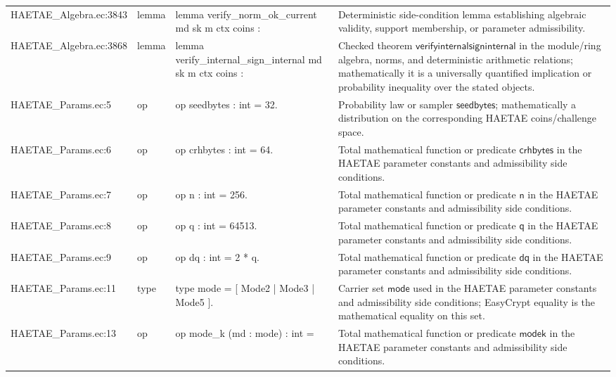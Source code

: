 \documentclass[10pt]{article}
\begin{document}
\begin{longtable}{L{0.11\textwidth}L{0.055\textwidth}L{0.385\textwidth}L{0.41\textwidth}}
HAETAE\_\allowbreak{}Algebra.\allowbreak{}ec:\allowbreak{}3843 & lemma & {\ttfamily\scriptsize lemma verify\_\allowbreak{}norm\_\allowbreak{}ok\_\allowbreak{}current md sk m ctx coins :} & Deterministic side-condition lemma establishing algebraic validity, support membership, or parameter admissibility. \\
HAETAE\_\allowbreak{}Algebra.\allowbreak{}ec:\allowbreak{}3868 & lemma & {\ttfamily\scriptsize lemma verify\_\allowbreak{}internal\_\allowbreak{}sign\_\allowbreak{}internal md sk m ctx coins :} & Checked theorem $\mathsf{verifyinternalsigninternal}$ in the module/ring algebra, norms, and deterministic arithmetic relations; mathematically it is a universally quantified implication or probability inequality over the stated objects. \\
HAETAE\_\allowbreak{}Params.\allowbreak{}ec:\allowbreak{}5 & op & {\ttfamily\scriptsize op seedbytes : int = 32.} & Probability law or sampler $\mathsf{seedbytes}$; mathematically a distribution on the corresponding HAETAE coins/challenge space. \\
HAETAE\_\allowbreak{}Params.\allowbreak{}ec:\allowbreak{}6 & op & {\ttfamily\scriptsize op crhbytes : int = 64.} & Total mathematical function or predicate $\mathsf{crhbytes}$ in the HAETAE parameter constants and admissibility side conditions. \\
HAETAE\_\allowbreak{}Params.\allowbreak{}ec:\allowbreak{}7 & op & {\ttfamily\scriptsize op n : int = 256.} & Total mathematical function or predicate $\mathsf{n}$ in the HAETAE parameter constants and admissibility side conditions. \\
HAETAE\_\allowbreak{}Params.\allowbreak{}ec:\allowbreak{}8 & op & {\ttfamily\scriptsize op q : int = 64513.} & Total mathematical function or predicate $\mathsf{q}$ in the HAETAE parameter constants and admissibility side conditions. \\
HAETAE\_\allowbreak{}Params.\allowbreak{}ec:\allowbreak{}9 & op & {\ttfamily\scriptsize op dq : int = 2 * q.} & Total mathematical function or predicate $\mathsf{dq}$ in the HAETAE parameter constants and admissibility side conditions. \\
HAETAE\_\allowbreak{}Params.\allowbreak{}ec:\allowbreak{}11 & type & {\ttfamily\scriptsize type mode = [ Mode2 | Mode3 | Mode5 ].} & Carrier set $\mathsf{mode}$ used in the HAETAE parameter constants and admissibility side conditions; EasyCrypt equality is the mathematical equality on this set. \\
HAETAE\_\allowbreak{}Params.\allowbreak{}ec:\allowbreak{}13 & op & {\ttfamily\scriptsize op mode\_\allowbreak{}k (md : mode) : int =} & Total mathematical function or predicate $\mathsf{modek}$ in the HAETAE parameter constants and admissibility side conditions. \\

\end{longtable}
\end{document}
